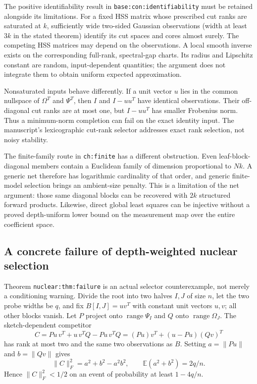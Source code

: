 \documentclass[11pt,oneside,openany,a4paper]{report}
\numberwithin{equation}{chapter}
\theoremstyle{definition}
\theoremstyle{remark}
\begin{document}
The positive identifiability result in
\texttt{base:con:identifiability} must be retained alongside its
limitations.  For a fixed HSS matrix whose prescribed cut ranks are
saturated at $k$, sufficiently wide two-sided Gaussian observations
(width at least $3k$ in the stated theorem) identify its cut spaces and
cores almost surely.  The competing HSS matrices may depend on the
observations.  A local smooth inverse exists on the corresponding
full-rank, spectral-gap charts.  Its radius and Lipschitz constant are
random, input-dependent quantities; the argument does not integrate
them to obtain uniform expected approximation.

Nonsaturated inputs behave differently.  If a unit vector $u$ lies in
the common nullspace of $\Omega^T$ and $\Psi^T$, then $I$ and
$I-uu^T$ have identical observations.  Their off-diagonal cut ranks are
at most one, but $I-uu^T$ has smaller Frobenius norm.  Thus a
minimum-norm completion can fail on the exact identity input.  The
manuscript's lexicographic cut-rank selector addresses exact rank
selection, not noisy stability.

The finite-family route in \texttt{ch:finite} has a different
obstruction.  Even leaf-block-diagonal members contain a Euclidean
family of dimension proportional to $Nk$.  A generic net therefore
has logarithmic cardinality of that order, and generic finite-model
selection brings an ambient-size penalty.  This is a limitation of
the net argument: those same diagonal blocks can be recovered with
$2k$ structured forward products.  Likewise, direct global least
squares can be injective without a proved depth-uniform lower bound
on the measurement map over the entire coefficient space.

\subsection{A concrete failure of depth-weighted nuclear selection}

Theorem \texttt{nuclear:thm:failure} is an actual selector
counterexample, not merely a conditioning warning.  Divide the root
into two halves $I,J$ of size $n$, let the two probe widths be $q$,
and fix
$B[I,J]=uv^T$ with constant unit vectors $u,v$; all other blocks vanish.
Let $P$ project onto $\operatorname{range}\Psi_I$ and $Q$ onto
$\operatorname{range}\Omega_J$.  The sketch-dependent competitor
\[
 C=Pu\,v^T+u\,v^TQ-Pu\,v^TQ
   =(Pu)v^T+(u-Pu)(Qv)^T
\]
has rank at most two and the same two observations as $B$.  Setting
$a=\|Pu\|$ and $b=\|Qv\|$ gives
\[
 \|C\|_F^2=a^2+b^2-a^2b^2,\qquad
 \mathbb E(a^2+b^2)=2q/n.
\]
Hence $\|C\|_F^2<1/2$ on an event of probability at least $1-4q/n$.
\end{document}
